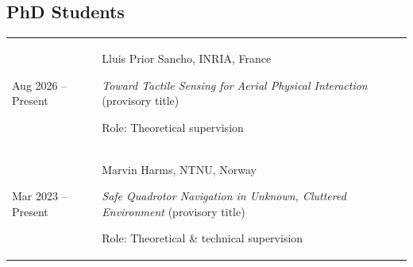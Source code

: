 \documentclass[11pt,a4paper]{article}
\newlength{\colone}
\newlength{\coltwo}
\begin{document}
\subsection{PhD Students}
\begin{longtable}{@{}p{\colone}p{\coltwo}@{}}
	Aug 2026 -- Present
		& {Lluis Prior Sancho, INRIA, France  \par
		\small\emph{Toward Tactile Sensing for Aerial Physical Interaction} (provisory title) \par
        Role: Theoretical supervision}
\\
	Mar 2023 -- Present
		& {Marvin Harms, NTNU, Norway  \par
		\small\emph{Safe Quadrotor Navigation in Unknown, Cluttered Environment} (provisory title) \par
        Role: Theoretical \& technical supervision}
\end{longtable}
\end{document}
